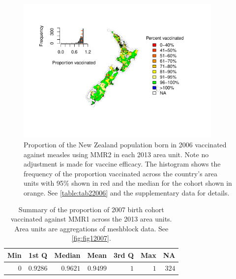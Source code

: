 \documentclass{article}
\begin{document}
\begin{figure}
\begin{center}
\includegraphics[width=0.9\textwidth]{nir_census_MMR2_NIR_2006.pdf}
\end{center}
    \caption{Proportion of the New Zealand population born in 2006 vaccinated against measles using MMR2 in each 2013 area unit. Note no adjustment is made for vaccine efficacy. The histogram shows the frequency of the proportion vaccinated across the country's area units with 95\% shown in red and the median for the cohort shown in orange. See \autoref{table:tab22006} and the supplementary data for details.}
\label{fig:fig22006}
\end{figure}

 \vspace{5mm} %
\begin{table}
\begin{center}
\begin{tabular}{rrrrrrr}
\hline\hline
\multicolumn{1}{c}{Min}&\multicolumn{1}{c}{1st Q}&\multicolumn{1}{c}{Median}&\multicolumn{1}{c}{Mean}&\multicolumn{1}{c}{3rd Q}&\multicolumn{1}{c}{Max}&\multicolumn{1}{c}{NA}\tabularnewline
\hline
$0$&$0.9286$&$0.9621$&$0.9499$&$1$&$1$&$324$\tabularnewline
\hline
\end{tabular}\end{center}\caption{Summary of the proportion of 2007 birth cohort vaccinated against MMR1 across the 2013 area units. Area units are aggregations of meshblock data. See \autoref{fig:fig12007}.}
\label{table:tab12007}
\end{table}
\end{document}
